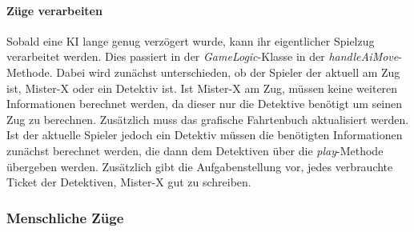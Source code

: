                 \paragraph{Züge verarbeiten}
                    Sobald eine KI lange genug verzögert wurde, kann ihr eigentlicher Spielzug verarbeitet werden.
                    Dies passiert in der \textit{GameLogic}-Klasse in der \textit{handleAiMove}-Methode.
                    Dabei wird zunächst unterschieden, ob der Spieler der aktuell am Zug ist, Mister-X oder ein Detektiv ist.
                    Ist Mister-X am Zug, müssen keine weiteren Informationen berechnet werden, da dieser nur die Detektive benötigt um seinen Zug zu berechnen.
                    Zusätzlich muss das grafische Fahrtenbuch aktualisiert werden.
                    \newline
                    Ist der aktuelle Spieler jedoch ein Detektiv müssen die benötigten Informationen zunächst berechnet werden, die dann dem Detektiven über 
                    die \textit{play}-Methode übergeben werden.
                    Zusätzlich gibt die Aufgabenstellung vor, jedes verbrauchte Ticket der Detektiven, Mister-X gut zu schreiben.

            \subsubsection{Menschliche Züge}

